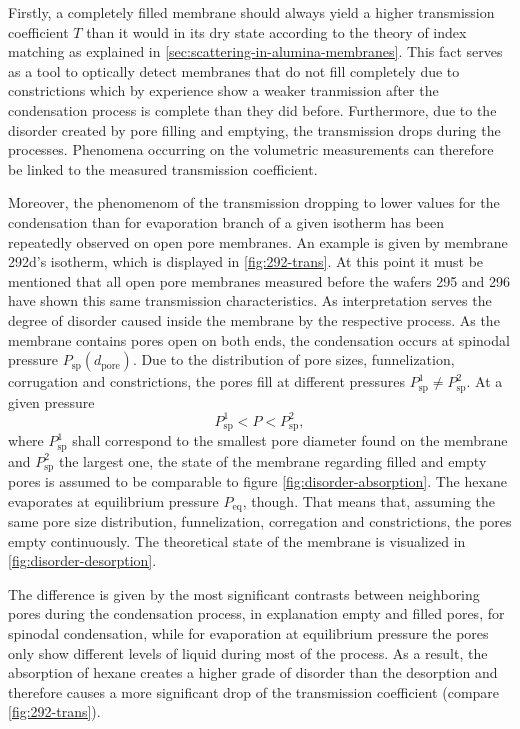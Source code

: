\documentclass[../thesis.tex]{subfiles}
\begin{document}
              

              Firstly, a completely filled membrane should always yield a higher transmission coefficient $T$ than it would in its dry state according to the theory of index matching as explained in \cref{sec:scattering-in-alumina-membranes}. This fact serves as a tool to optically detect membranes that do not fill completely due to constrictions which by experience show a weaker tranmission after the condensation process is complete than they did before. Furthermore, due to the disorder created by pore filling and emptying, the transmission drops during the processes. Phenomena occurring on the volumetric measurements can therefore be linked to the measured transmission coefficient.

              Moreover, the phenomenom of the transmission dropping to lower values for the condensation than for evaporation branch of a given isotherm has been repeatedly observed on open pore membranes. An example is given by membrane 292d's isotherm, which is displayed in \cref{fig:292-trans}. At this point it must be mentioned that all open pore membranes measured before the wafers 295 and 296 have shown this same transmission characteristics. As interpretation serves the degree of disorder caused inside the membrane by the respective process. As the membrane contains pores open on both ends, the condensation occurs at spinodal pressure $P_\mathrm{sp}(d_\mathrm{pore})$. Due to the distribution of pore sizes, funnelization, corrugation and constrictions, the pores fill at different pressures $P_\mathrm{sp}^1 \neq P_\mathrm{sp}^2$. At a given pressure
              \begin{equation*}
                  P_\mathrm{sp}^1 < P < P_\mathrm{sp}^2,
              \end{equation*}
              where $P_\mathrm{sp}^1$ shall correspond to the smallest pore diameter found on the membrane and $P_\mathrm{sp}^2$ the largest one, the state of the me{}mbrane regarding filled and empty pores is assumed to be comparable to figure \cref{fig:disorder-absorption}. The hexane evaporates at equilibrium pressure $P_\mathrm{eq}$, though. That means that, assuming the same pore size distribution, funnelization, corregation and constrictions, the pores empty continuously. The theoretical state of the membrane is visualized in \cref{fig:disorder-desorption}.

              The difference is given by the most significant contrasts between neighboring pores during the condensation process, in explanation empty and filled pores, for spinodal condensation, while for evaporation at equilibrium pressure the pores only show different levels of liquid during most of the process. As a result, the absorption of hexane creates a higher grade of disorder than the desorption and therefore causes a more significant drop of the transmission coefficient (compare \cref{fig:292-trans}).
              \medskip
\end{document}
